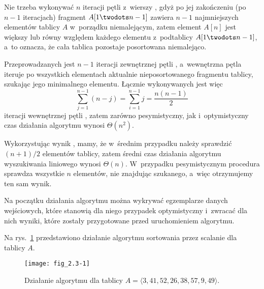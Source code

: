 Nie trzeba wykonywać $n$ iteracji pętli  z~wierszy \doubledash{\ref{li:selection-sort-for-begin}}{\ref{li:selection-sort-for-end}}, gdyż po jej zakończeniu (po $n-1$ iteracjach) fragment $A[1\twodots n-1]$ zawiera $n-1$ najmniejszych elementów tablicy $A$ w~porządku niemalejącym, zatem element $A[n]$ jest większy lub równy względem każdego elementu z~podtablicy $A[1\twodots n-1]$, a~to oznacza, że cała tablica pozostaje posortowana niemalejąco.

Przeprowadzanych jest $n-1$ iteracji zewnętrznej pętli , a~wewnętrzna pętla  iteruje po wszystkich elementach aktualnie nieposortowanego fragmentu tablicy, szukając jego minimalnego elementu.
Łącznie wykonywanych jest więc
\[
	\sum_{j=1}^{n-1}(n-j) = \sum_{i=1}^{n-1}j = \frac{n(n-1)}{2}
\]
iteracji wewnętrznej pętli , zatem zarówno pesymistyczny, jak i~optymistyczny czas działania algorytmu wynosi $\Theta(n^2)$.

\exercise %
Wykorzystując wynik , mamy, że w~średnim przypadku należy sprawdzić $(n+1)/2$ elementów tablicy, zatem średni czas działania algorytmu wyszukiwania liniowego wynosi $\Theta(n)$.
W~przypadku pesymistycznym procedura sprawdza wszystkie $n$ elementów, nie znajdując szukanego, a~więc otrzymujemy ten sam wynik.

\exercise %
Na początku działania algorytmu można wykrywać egzemplarze danych wejściowych, które stanowią dla niego przypadek optymistyczny i~zwracać dla nich wyniki, które zostały przygotowane przed uruchomieniem algorytmu.


\exercise %
Na rys.\ \ref{fig:2.3-1} przedstawiono działanie algorytmu sortowania przez scalanie dla tablicy $A$.
\begin{figure}[ht]
	\begin{center}
		\texttt{[image: fig\_2.3-1]}
	\end{center}
	\caption{Działanie algorytmu  dla tablicy $A=\langle3,41,52,26,38,57,9,49\rangle$.} \label{fig:2.3-1}
\end{figure}

